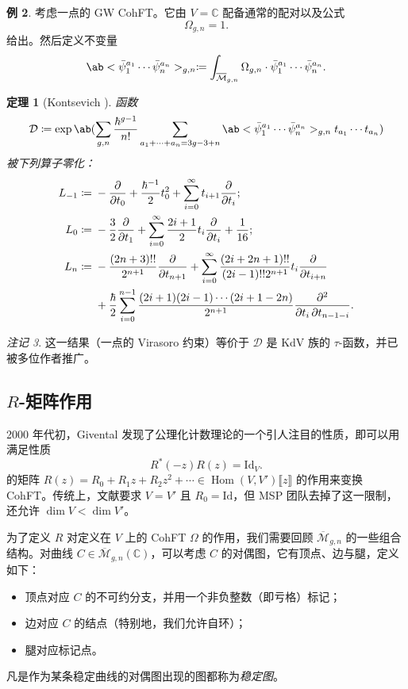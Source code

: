 \documentclass{amsart}
\newtheorem{thm}{定理}[section]
\theoremstyle{definition}
\newtheorem{exm}[thm]{例}
\theoremstyle{remark}
\newtheorem{rmk}[thm]{注记}
\theoremstyle{plain}
\theoremstyle{definition}
\theoremstyle{remark}
\newcommand{\C}{\mathbb{C}}
\newcommand{\Mbar}{\overline{\mathcal{M}}}
\newcommand{\mc}[1]{\mathcal{#1}}
\newcommand{\mr}[1]{\mathrm{#1}}
\newcommand{\1}{\mathbf{1}}
\newcommand{\2}{\mathbf{2}}
\newcommand{\3}{\mathbf{3}}
\newcommand{\ps}[1]{\llbracket #1 \rrbracket}
\DeclareMathOperator{\Hom}{Hom}
\begin{document}
\begin{exm}
    考虑一点的 GW CohFT。它由 $V = \C$ 配备通常的配对以及公式
    \[ \Omega_{g,n} = 1. \]
    给出。然后定义不变量
    \[ \ab<\bar{\psi}_1^{a_1} \cdots \bar{\psi}_n^{a_n}>_{g,n} \coloneqq \int_{\Mbar_{g,n}} \Omega_{g,n} \cdot \bar{\psi}_1^{a_1} \cdots \bar{\psi}_n^{a_n}. \]
    \begin{thm}[Kontsevich {\cite{Kontsevich1992}}]
        函数
        \[ \mc{D} \coloneqq \exp \ab(\sum_{g,n} \frac{\hbar^{g-1}}{n!}\sum_{a_1 + \cdots + a_n = 3g-3+n} \ab<\bar{\psi}_1^{a_1} \cdots \bar{\psi}_n^{a_n}>_{g,n} t_{a_1}\cdots t_{a_n}) \]
        被下列算子零化：
        \begin{align*}
            L_{-1} \coloneqq{}& -\pdv{}{t_0} + \frac{\hbar^{-1}}{2} t_0^2 + \sum_{i=0}^{\infty} t_{i+1} \pdv{}{t_i};\\
            L_0 \coloneqq{}& -\frac{3}{2} \pdv{}{t_1} + \sum_{i=0}^{\infty} \frac{2i+1}{2} t_i \pdv{}{t_i} + \frac{1}{16};\\
            L_n \coloneqq{}& -\frac{(2n+3)!!}{2^{n+1}} \pdv{}{t_{n+1}} + \sum_{i=0}^{\infty} \frac{(2i+2n+1)!!}{(2i-1)!! 2^{n+1}} t_i \pdv{}{t_{i+n}} \\
            &+ \frac{\hbar}{2} \sum_{i=0}^{n-1} \frac{(2i+1) (2i-1) \cdots (2i+1-2n)}{2^{n+1}} \pdv{}{t_i,t_{n-1-i}}.
        \end{align*}
    \end{thm}
\end{exm}

\begin{rmk}
    这一结果（一点的 Virasoro 约束）等价于 $\mc{D}$ 是 KdV 族的 $\tau$-函数，并已被多位作者推广。
\end{rmk}



\subsection{$R$-矩阵作用}%
\label{sub:R-matrix action}

2000 年代初，Givental 发现了公理化计数理论的一个引人注目的性质，即可以用满足性质
\[ R^*(-z) R(z) = \mr{Id}_V. \]
的矩阵 $R(z) = R_0 + R_1 z + R_2 z^2 + \cdots \in \Hom(V, V')\ps{z}$ 的作用来变换 CohFT。传统上，文献要求 $V = V'$ 且 $R_0 = \mr{Id}$，但 MSP 团队去掉了这一限制，还允许 $\dim V < \dim V'$。

为了定义 $R$ 对定义在 $V$ 上的 CohFT $\Omega$ 的作用，我们需要回顾 $\Mbar_{g,n}$ 的一些组合结构。对曲线 $C\in \Mbar_{g,n}(\C)$，可以考虑 $C$ 的对偶图，它有顶点、边与腿，定义如下：
\begin{itemize}
    \item 顶点对应 $C$ 的不可约分支，并用一个非负整数（即亏格）标记；
    \item 边对应 $C$ 的结点（特别地，我们允许自环）；
    \item 腿对应标记点。
\end{itemize}
凡是作为某条稳定曲线的对偶图出现的图都称为\textit{稳定图}。
\end{document}
